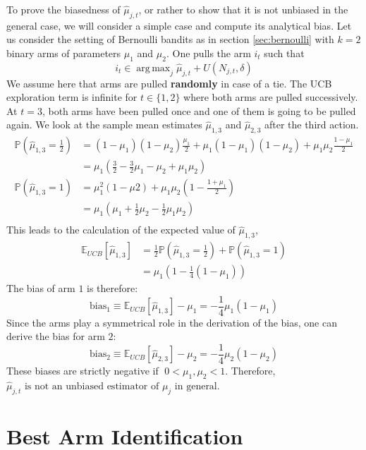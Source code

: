 \documentclass[a4paper]{article}
\newcommand{\wh}[1]{\widehat{#1}}
\DeclareMathOperator*{\argmax}{\arg\,\max}
\begin{document}
To prove the biasedness of $\wh\mu_{j,t}$, or rather to show that it is not unbiased in the general case, we will consider a simple case and compute its analytical bias. Let us consider the setting of Bernoulli bandits as in section \ref{sec:bernoulli} with $k=2$ binary arms of parameters $\mu_1$ and $\mu_2$. One pulls the arm $i_t$ such that
\[
i_t \in \argmax_{j} \wh\mu_{j,t} + U(N_{j,t}, \delta)
\]
We assume here that arms are pulled \textbf{randomly} in case of a tie. The UCB exploration term is infinite for $t \in \{1,2\}$ where both arms are pulled successively. At $t=3$, both arms have been pulled once and one of them is going to be pulled again. We look at the sample mean estimates $\wh\mu_{1,3}$ and $\wh\mu_{2,3}$ after the third action.
\begin{align*}
	\mathbb{P}\left(\wh\mu_{1,3} = \frac{1}{2}\right) &= (1-\mu_1)(1-\mu_2)\frac{\mu_1}{2} + \mu_1(1-\mu_1)(1-\mu_2) + \mu_1\mu_2\frac{1-\mu_1}{2} \\
	&= \mu_1\left(\frac{3}{2} - \frac{3}{2}\mu_1 - \mu_2 + \mu_1\mu_2\right) \\
	\mathbb{P}\left(\wh\mu_{1,3} = 1\right) &= \mu_1^2(1-\mu2) + \mu_1\mu_2(1-\frac{1+\mu_1}{2}) \\
	&= \mu_1\left(\mu_1 + \frac{1}{2}\mu_2 - \frac{1}{2}\mu_1\mu_2\right) \\
\end{align*}
This leads to the calculation of the expected value of $\wh\mu_{1,3}$,
\begin{align*}
	\mathbb{E}_{UCB}\left[\wh\mu_{1,3}\right] &= \frac{1}{2}\mathbb{P}\left(\wh\mu_{1,3} = \frac{1}{2}\right) + \mathbb{P}\left(\wh\mu_{1,3} = 1\right) \\
	&= \mu_1\left(1 - \frac{1}{4}\left(1-\mu_1\right)\right)
\end{align*}
The bias of arm $1$ is therefore:
\[
	\boxed{\text{bias}_1 \equiv \mathbb{E}_{UCB}\left[\wh\mu_{1,3}\right] - \mu_1 = -\frac{1}{4}\mu_1(1-\mu_1)}
\]
Since the arms play a symmetrical role in the derivation of the bias, one can derive the bias for arm $2$:
\[
\boxed{\text{bias}_2 \equiv \mathbb{E}_{UCB}\left[\wh\mu_{2,3}\right] - \mu_2 = -\frac{1}{4}\mu_2(1-\mu_2)}
\]
These biases are strictly negative if $\; 0 < \mu_1,\mu_2 < 1 $. Therefore, $\boxed{\wh\mu_{j,t} \text{ is not an unbiased estimator of } \mu_j \text{ in general}}$.



\section{Best Arm Identification}
\end{document}
